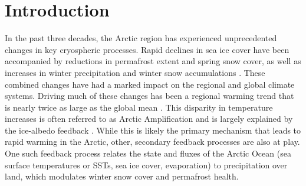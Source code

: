 \section{Introduction}
\label{sec:intro_ch5}

In the past three decades, the Arctic region has experienced unprecedented changes in key cryospheric processes.
Rapid declines in sea ice cover have been accompanied by reductions in permafrost extent and spring snow cover, as well as increases in winter precipitation and winter snow accumulations \citep{Kohler_2006,Callaghan_2011,Bulygina_2009}.
These combined changes have had a marked impact on the regional and global climate systems.
Driving much of these changes has been a regional warming trend that is nearly twice as large as the global mean \citep{Serreze_2006c,Screen_2010}.
This disparity in temperature increases is often referred to as Arctic Amplification and is largely explained by the ice-albedo feedback \citep{Curry_1995}.
While this is likely the primary mechanism that leads to rapid warming in the Arctic, other, secondary feedback processes are also at play.
One such feedback process relates the state and fluxes of the Arctic Ocean (sea surface temperatures or SSTs, sea ice cover, evaporation) to precipitation over land, which modulates winter snow cover and permafrost health.

